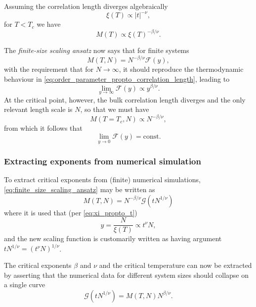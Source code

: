 Assuming the correlation length diverges algebraically
\begin{equation}\label{eq:xi_propto_t}
  \xi(T) \propto |t|^{-\nu},
\end{equation}
for $T < T_c$ we have
\begin{equation}\label{eq:order_parameter_propto_correlation_length}
  M(T) \propto \xi(T)^{-\beta / \nu}.
\end{equation}

The \emph{finite-size scaling ansatz} now says that for finite systems
\begin{equation}\label{eq:finite_size_scaling_ansatz}
  M(T, N) = N^{-\beta/\nu}\mathcal{F}(y),
\end{equation}
with the requirement that for $N \to \infty$, it should reproduce the thermodynamic behaviour
in \autoref{eq:order_parameter_propto_correlation_length}, leading to
\begin{equation}
  \lim_{y \to \infty} \mathcal{F}(y) \propto y^{\beta/\nu}.
\end{equation}
At the critical point, however, the bulk correlation length diverges and the only relevant length scale is $N$,
so that we must have
\begin{equation}
  M(T = T_c, N) \propto N^{-\beta / \nu},
\end{equation}
from which it follows that
\begin{equation}
  \lim_{y \to 0} \mathcal{F}(y) = \text{const}.
\end{equation}

\subsubsection{Extracting exponents from numerical simulation}

To extract critical exponents from (finite) numerical simulations, \autoref{eq:finite_size_scaling_ansatz} may be
written as
\begin{equation}\label{eq:finite_size_scaling_ansatz_tN}
  M(T, N) = N^{-\beta/\nu} \mathcal{G}(t N^{1/\nu})
\end{equation}
where it is used that (per \autoref{eq:xi_propto_t})
\begin{equation}
  y = \frac{N}{\xi(T)} \propto t^{\nu} N,
\end{equation}
and the new scaling function is customarily written as having argument $t N^{1/\nu} = (t^{\nu} N)^{1/\nu}$.

The critical exponents $\beta$ and $\nu$ and the critical temperature can now be extracted by asserting that the
numerical data for different system sizes should collapse on a single curve
\begin{equation}
  \mathcal{G}(t N^{1/\nu}) = M(T, N) N^{\beta/\nu}.
\end{equation}


